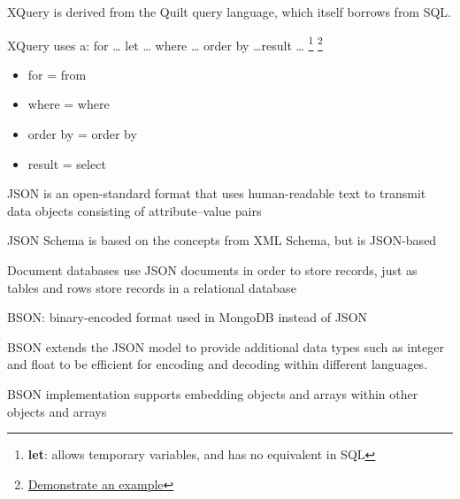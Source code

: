 \documentclass{beamer}
\begin{document}
\begin{slide}{
\item XQuery is derived from the Quilt query language, which itself borrows from SQL.
\item XQuery uses a:    for … let … where … order by …result …  \footnote{  \textbf{let}: allows temporary variables, and has no equivalent in SQL}
\footnote{ \href{http://www.w3schools.com/xsl/xquery_flwor.asp}{Demonstrate an example}}
\begin{itemize}
	\item for			=	 from 
	\item where		=	 where
	\item order by	=	 order by
	\item result		=	 select
\end{itemize}
}\end{slide}

\begin{slide}{
\item JSON is an open-standard format that uses human-readable text to transmit data objects consisting of attribute–value pairs
\item JSON Schema is based on the concepts from XML Schema, but is JSON-based
\item Document databases use JSON documents in order to store records, just as tables and rows store records in a relational database
}\end{slide}

\begin{slide}{
\item BSON: binary-encoded format used in MongoDB instead of JSON
\item BSON extends the JSON model to provide additional data types such as integer and float to be efficient for encoding and decoding within different languages.
\item BSON implementation supports embedding objects and arrays within other objects and arrays
}\end{slide}
\end{document}
